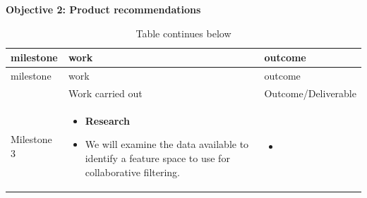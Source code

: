 \documentclass[
]{book}
\providecommand{\tightlist}{%
  \setlength{\itemsep}{0pt}\setlength{\parskip}{0pt}}
\begin{document}
\textbf{Objective 2: Product recommendations}

\begin{longtable}[]{@{}lll@{}}
\caption{Table continues below}\tabularnewline
\toprule
\begin{minipage}[b]{0.17\columnwidth}\raggedright
milestone\strut
\end{minipage} & \begin{minipage}[b]{0.35\columnwidth}\raggedright
work\strut
\end{minipage} & \begin{minipage}[b]{0.40\columnwidth}\raggedright
outcome\strut
\end{minipage}\tabularnewline
\midrule
\endfirsthead
\toprule
\begin{minipage}[b]{0.17\columnwidth}\raggedright
milestone\strut
\end{minipage} & \begin{minipage}[b]{0.35\columnwidth}\raggedright
work\strut
\end{minipage} & \begin{minipage}[b]{0.40\columnwidth}\raggedright
outcome\strut
\end{minipage}\tabularnewline
\midrule
\endhead
\begin{minipage}[t]{0.17\columnwidth}\raggedright
\strut
\end{minipage} & \begin{minipage}[t]{0.35\columnwidth}\raggedright
Work carried out\strut
\end{minipage} & \begin{minipage}[t]{0.40\columnwidth}\raggedright
Outcome/Deliverable\strut
\end{minipage}\tabularnewline
\begin{minipage}[t]{0.17\columnwidth}\raggedright
Milestone 3\strut
\end{minipage} & \begin{minipage}[t]{0.35\columnwidth}\raggedright
\begin{itemize}
\tightlist
\item
  \textbf{Research}
\item
  We will examine the data
  available to identify a
  feature space to use for
  collaborative filtering.
\end{itemize}\strut
\end{minipage} & \begin{minipage}[t]{0.40\columnwidth}\raggedright
\begin{itemize}
\tightlist
\item

\end{itemize}
\end{minipage}
\end{longtable}
\end{document}
